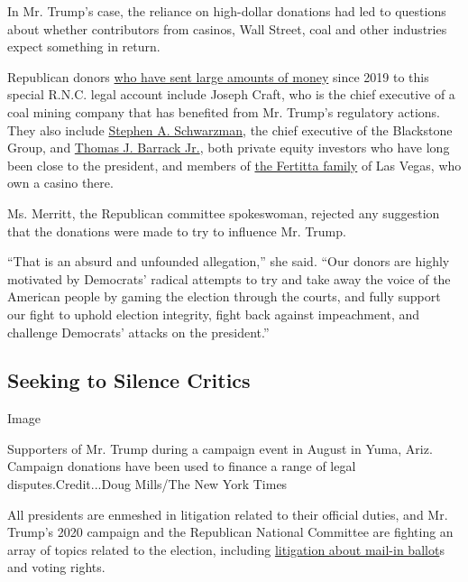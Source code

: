 In Mr. Trump's case, the reliance on high-dollar donations had led to
questions about whether contributors from casinos, Wall Street, coal and
other industries expect something in return.

Republican donors
\href{https://www.fec.gov/data/receipts/individual-contributions/?committee_id=C00003418\&two_year_transaction_period=2020\&min_date=01\%2F01\%2F2019\&max_date=12\%2F31\%2F2020\&min_amount=106\%2C500\&max_amount=106\%2C500}{who
have sent large amounts of money} since 2019 to this special R.N.C.
legal account include Joseph Craft, who is the chief executive of a coal
mining company that has benefited from Mr. Trump's regulatory actions.
They also include
\href{https://www.nytimes3xbfgragh.onion/2020/04/03/business/dealbook/trump-coronavirus-advisors.html}{Stephen
A. Schwarzman}, the chief executive of the Blackstone Group, and
\href{https://www.nytimes3xbfgragh.onion/2019/07/28/us/politics/thomas-barrack-foreign-lobbying.html}{Thomas
J. Barrack Jr.}, both private equity investors who have long been close
to the president, and members of
\href{https://www.forbes.com/profile/fertitta/\#755ed51d34b4}{the
Fertitta family} of Las Vegas, who own a casino there.

Ms. Merritt, the Republican committee spokeswoman, rejected any
suggestion that the donations were made to try to influence Mr. Trump.

``That is an absurd and unfounded allegation,'' she said. ``Our donors
are highly motivated by Democrats' radical attempts to try and take away
the voice of the American people by gaming the election through the
courts, and fully support our fight to uphold election integrity, fight
back against impeachment, and challenge Democrats' attacks on the
president.''

\hypertarget{seeking-to-silence-critics}{%
\subsection{Seeking to Silence
Critics}\label{seeking-to-silence-critics}}

Image

Supporters of Mr. Trump during a campaign event in August in Yuma, Ariz.
Campaign donations have been used to finance a range of legal
disputes.Credit...Doug Mills/The New York Times

All presidents are enmeshed in litigation related to their official
duties, and Mr. Trump's 2020 campaign and the Republican National
Committee are fighting an array of topics related to the election,
including
\href{https://www.nytimes3xbfgragh.onion/2020/08/08/us/politics/voting-nov-3-election.html}{litigation
about mail-in ballot}s and voting rights.

